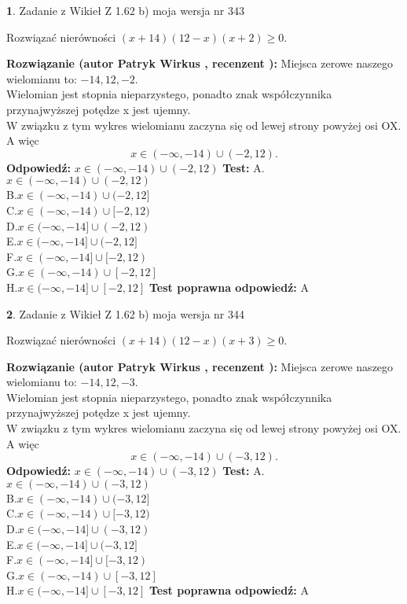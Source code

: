 \documentclass[12pt, a4paper]{article}
\theoremstyle{definition} %
\newtheorem{zad}{}
\newcommand{\zadStart}[1]{\begin{zad}#1\newline}
\newcommand{\zadStop}{\end{zad}}
\newcommand{\rozwStart}[2]{\noindent \textbf{Rozwiązanie (autor #1 , recenzent #2): }\newline}
\newcommand{\rozwStop}{\newline}
\newcommand{\odpStart}{\noindent \textbf{Odpowiedź:}\newline}
\newcommand{\odpStop}{\newline}
\newcommand{\testStart}{\noindent \textbf{Test:}\newline}
\newcommand{\testStop}{\newline}
\newcommand{\kluczStart}{\noindent \textbf{Test poprawna odpowiedź:}\newline}
\newcommand{\kluczStop}{\newline}
\begin{document}
\zadStart{Zadanie z Wikieł Z 1.62 b) moja wersja nr 343}

Rozwiązać nierówności $(x+14)(12-x)(x+2)\ge0$.
\zadStop
\rozwStart{Patryk Wirkus}{}
Miejsca zerowe naszego wielomianu to: $-14, 12, -2$.\\
Wielomian jest stopnia nieparzystego, ponadto znak współczynnika przy\linebreak najwyższej potędze x jest ujemny.\\ W związku z tym wykres wielomianu zaczyna się od lewej strony powyżej osi OX. A więc $$x \in (-\infty,-14) \cup (-2,12).$$
\rozwStop
\odpStart
$x \in (-\infty,-14) \cup (-2,12)$
\odpStop
\testStart
A.$x \in (-\infty,-14) \cup (-2,12)$\\
B.$x \in (-\infty,-14) \cup (-2,12]$\\
C.$x \in (-\infty,-14) \cup [-2,12)$\\
D.$x \in (-\infty,-14] \cup (-2,12)$\\
E.$x \in (-\infty,-14] \cup (-2,12]$\\
F.$x \in (-\infty,-14] \cup [-2,12)$\\
G.$x \in (-\infty,-14) \cup [-2,12]$\\
H.$x \in (-\infty,-14] \cup [-2,12]$
\testStop
\kluczStart
A
\kluczStop



\zadStart{Zadanie z Wikieł Z 1.62 b) moja wersja nr 344}

Rozwiązać nierówności $(x+14)(12-x)(x+3)\ge0$.
\zadStop
\rozwStart{Patryk Wirkus}{}
Miejsca zerowe naszego wielomianu to: $-14, 12, -3$.\\
Wielomian jest stopnia nieparzystego, ponadto znak współczynnika przy\linebreak najwyższej potędze x jest ujemny.\\ W związku z tym wykres wielomianu zaczyna się od lewej strony powyżej osi OX. A więc $$x \in (-\infty,-14) \cup (-3,12).$$
\rozwStop
\odpStart
$x \in (-\infty,-14) \cup (-3,12)$
\odpStop
\testStart
A.$x \in (-\infty,-14) \cup (-3,12)$\\
B.$x \in (-\infty,-14) \cup (-3,12]$\\
C.$x \in (-\infty,-14) \cup [-3,12)$\\
D.$x \in (-\infty,-14] \cup (-3,12)$\\
E.$x \in (-\infty,-14] \cup (-3,12]$\\
F.$x \in (-\infty,-14] \cup [-3,12)$\\
G.$x \in (-\infty,-14) \cup [-3,12]$\\
H.$x \in (-\infty,-14] \cup [-3,12]$
\testStop
\kluczStart
A
\kluczStop
\end{document}
